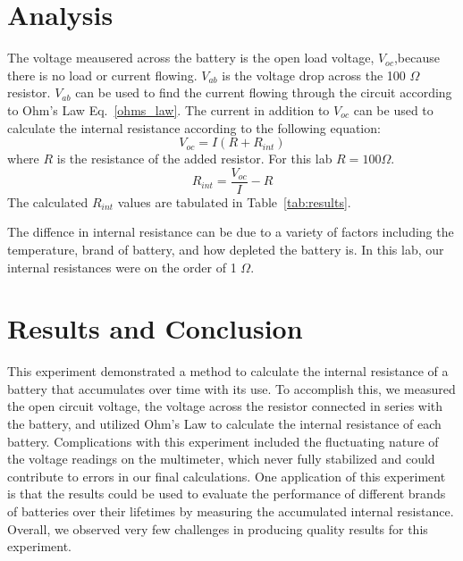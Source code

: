 \documentclass{report}
\begin{document}
\section{Analysis}
The voltage meausered across the battery is the open load voltage, $V_{oc}$,because there is no load or current flowing.
$V_{ab}$ is the voltage drop across the 100 $\Omega$ resistor.
$V_{ab}$ can be used to find the current flowing through the circuit according to Ohm's Law Eq.~\ref{ohms_law}.
The current in addition to $V_{oc}$ can be used to calculate the internal resistance according to the following equation:
\begin{equation}
    V_{oc} = I(R+R_{int})
\end{equation}
where $R$ is the resistance of the added resistor.
For this lab $R = 100 \Omega$.
\begin{equation}
    R_{int} = \frac{V_{oc}}{I}-R
\end{equation}
The calculated $R_{int}$ values are tabulated in Table~\ref{tab:results}.

The diffence in internal resistance can be due to a variety of factors including the temperature, brand of battery, and how depleted the battery is.
In this lab, our internal resistances were on the order of 1 $\Omega$.

\section{Results and Conclusion}
This experiment demonstrated a method to calculate the internal resistance of a battery that accumulates over time with its use.
To accomplish this, we measured the open circuit voltage, the voltage across the resistor connected in series with the battery, and utilized Ohm's Law to calculate the internal resistance of each battery.
Complications with this experiment included the fluctuating nature of the voltage readings on the multimeter, which never fully stabilized and could contribute to errors in our final calculations.
One application of this experiment is that the results could be used to evaluate the performance of different brands of batteries over their lifetimes by measuring the accumulated internal resistance.
Overall, we observed very few challenges in producing quality results for this experiment.
\end{document}
